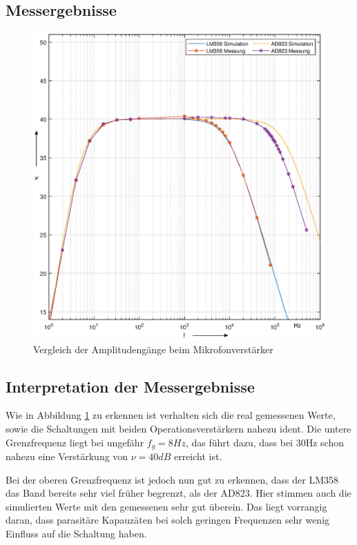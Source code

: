 \subsection{Messergebnisse}
\begin{figure}[H]
    \centering
    \includegraphics[width=\costumPicWidth]{Lab_3/Plots/Mikrofonverstaerker.eps}
    \caption{Vergleich der Amplitudengänge beim Mikrofonverstärker}
    \label{fig:Amplitudengang_Mikverstaerker}
\end{figure}

\subsection{Interpretation der Messergebnisse} 
Wie in Abbildung \ref{fig:Amplitudengang_Mikverstaerker} zu erkennen ist verhalten sich die real gemessenen Werte, sowie die Schaltungen mit beiden Operationsverstärkern nahezu ident. Die untere Grenzfrequenz liegt bei ungefähr $f_g=8Hz$, das führt dazu, dass bei 30Hz schon nahezu eine Verstärkung von $\nu = 40dB$ erreicht ist.

Bei der oberen Grenzfrequenz ist jedoch nun gut zu erkennen, dass der LM358 das Band bereits sehr viel früher begrenzt, als der AD823. Hier stimmen auch die simulierten Werte mit den gemessenen sehr gut überein. Das liegt vorrangig daran, dass parasitäre Kapauzäten bei solch geringen Frequenzen sehr wenig Einfluss auf die Schaltung haben.

